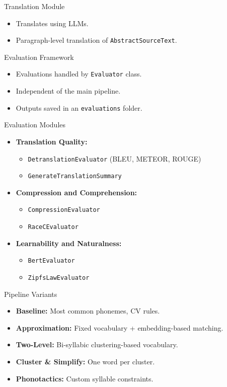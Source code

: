 \documentclass{beamer}
\begin{document}
\begin{frame}{Translation Module}
	\begin{itemize}
		\item Translates using LLMs.
		\item Paragraph-level translation of \texttt{AbstractSourceText}.
	\end{itemize}
\end{frame}

\begin{frame}{Evaluation Framework}
	\begin{itemize}
		\item Evaluations handled by \texttt{Evaluator} class.
		\item Independent of the main pipeline.
		\item Outputs saved in an \texttt{evaluations} folder.
	\end{itemize}
\end{frame}

\begin{frame}{Evaluation Modules}
	\begin{itemize}
		\item \textbf{Translation Quality:}
		\begin{itemize}
			\item \texttt{DetranslationEvaluator} (BLEU, METEOR, ROUGE)
			\item \texttt{GenerateTranslationSummary}
		\end{itemize}
		\item \textbf{Compression and Comprehension:}
		\begin{itemize}
			\item \texttt{CompressionEvaluator}
			\item \texttt{RaceCEvaluator}
		\end{itemize}
		\item \textbf{Learnability and Naturalness:}
		\begin{itemize}
			\item \texttt{BertEvaluator}
			\item \texttt{ZipfsLawEvaluator}
		\end{itemize}
	\end{itemize}
\end{frame}

\begin{frame}{Pipeline Variants}
	\begin{itemize}
		\item \textbf{Baseline:} Most common phonemes, CV rules.
		\item \textbf{Approximation:} Fixed vocabulary + embedding-based matching.
		\item \textbf{Two-Level:} Bi-syllabic clustering-based vocabulary.
		\item \textbf{Cluster \& Simplify:} One word per cluster.
		\item \textbf{Phonotactics:} Custom syllable constraints.
	\end{itemize}
\end{frame}
\end{document}
